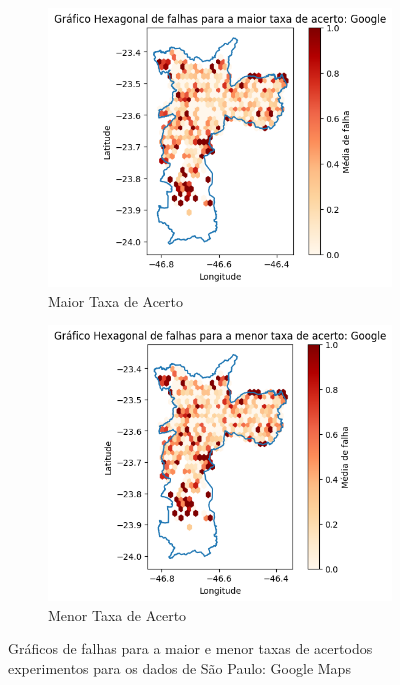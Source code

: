 \begin{figure}[ht]
    \centering
    \begin{subfigure}[b]{0.45\textwidth}
      \includegraphics[width=\textwidth]{Figuras/expFalhasGooglemaiorSP.png}
      \caption{Maior Taxa de Acerto}
      \label{fig:falhasgoogleSPexpMaior}
    \end{subfigure}
    \hfill
    \begin{subfigure}[b]{0.45\textwidth}
      \includegraphics[width=\textwidth]{Figuras/expFalhasGooglemenorSP.png}
      \caption{Menor Taxa de Acerto}
      \label{fig:falhasgoogleSPexpMenor}
    \end{subfigure}
    
    \caption{Gráficos de falhas para a maior e menor taxas de acertodos experimentos para os dados de São Paulo: Google Maps}
    \label{fig:falhas-exp-google-sp}
\end{figure}


